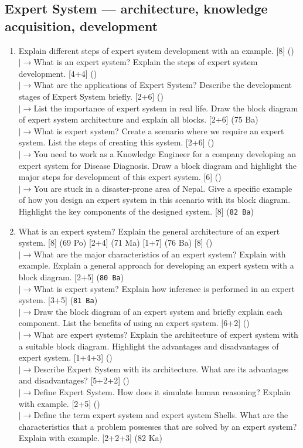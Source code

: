 \documentclass[12pt]{article}
\newcommand{\lb}{\\$\left|\rightarrow\right.$}
\begin{document}
  \subsection{Expert System --- architecture, knowledge acquisition, development}
    \begin{enumerate}[topsep=0pt, noitemsep]
      \item Explain different steps of expert system development with an example. \hfill [8] ()
        \lb What is an expert system? Explain the steps of expert system development. \hfill [4+4] ()
        \lb What are the applications of Expert System? Describe the development stages of Expert System briefly. \hfill [2+6] ()
        \lb List the importance of expert system in real life. Draw the block diagram of expert system architecture and explain all blocks. \hfill [2+6] (75 Ba)
        \lb What is expert system? Create a scenario where we require an expert system. List the steps of creating this system. \hfill [2+6] ()
        \lb You need to work as a Knowledge Engineer for a company developing an expert system for Disease Diagnosis. Draw a block diagram and highlight the major steps for development of this expert system. \hfill [6] ()
        \lb You are stuck in a disaster-prone area of Nepal. Give a specific example of how you design an expert system in this scenario with its block diagram. Highlight the key components of the designed system. \hfill [8] (\texttt{82 Ba})

      \item What is an expert system? Explain the general architecture of an expert system. \hfill [8] (69 Po) [2+4] (71 Ma) [1+7] (76 Ba) [8] ()
        \lb What are the major characteristics of an expert system? Explain with example. Explain a general approach for developing an expert system with a block diagram. \hfill [2+5] (\texttt{80 Ba})
        \lb What is expert system? Explain how inference is performed in an expert system. \hfill [3+5] (\texttt{81 Ba})
        \lb Draw the block diagram of an expert system and briefly explain each component. List the benefits of using an expert system. \hfill [6+2] ()
        \lb What are expert systems? Explain the architecture of expert system with a suitable block diagram. Highlight the advantages and disadvantages of expert system. \hfill [1+4+3] ()
        \lb Describe Expert System with its architecture. What are its advantages and disadvantages? \hfill [5+2+2] ()
        \lb Define Expert System. How does it simulate human reasoning? Explain with example. \hfill [2+5] ()
        \lb Define the term expert system and expert system Shells. What are the characteristics that a problem possesses that are solved by an expert system? Explain with example. \hfill [2+2+3] (82 Ka)


\end{enumerate}
\end{document}
